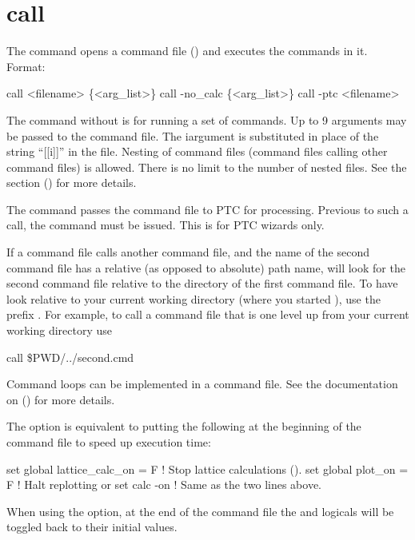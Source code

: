 \section{call}
\label{s:call}

The  command opens a command file () and executes the commands in
it. Format: 
\vskip 1pt
\begin{example}
  call <filename> \{<arg_list>\}
  call -no_calc \{<arg_list>\}
  call -ptc <filename>
\end{example}

\vskip 1pt 
The  command without  is for running a set of \tao commands.  Up to 9
arguments may be passed to the command file. The i\Th argument is substituted in place of the string
``[[i]]'' in the file. Nesting of command files (command files calling other command files) is
allowed. There is no limit to the number of nested files.  See the 
section () for more details.

The  command passes the command file to PTC for processing. Previous to such a call,
the command  must be issued. This is for PTC wizards only.

If a command file calls another command file, and the name of the second command file has a relative
(as opposed to absolute) path name, \tao will look for the second command file relative to the
directory of the first command file. To have \tao look relative to your current working directory
(where you started \tao), use the prefix . For example, to call a command file that is
one level up from your current working directory use
\begin{example}
  call \$PWD/../second.cmd
\end{example}

Command loops can be implemented in a command file. See the documentation on 
() for more details.

The  option is equivalent to putting the following at the beginning of the
command file to speed up execution time:
\begin{example}
  set global lattice_calc_on = F   ! Stop lattice calculations ().
  set global plot_on = F           ! Halt replotting 
or
  set calc -on                     ! Same as the two lines above.
\end{example}
When using the  option, at the end of the command file the  and
 logicals will be toggled back to their initial values.


